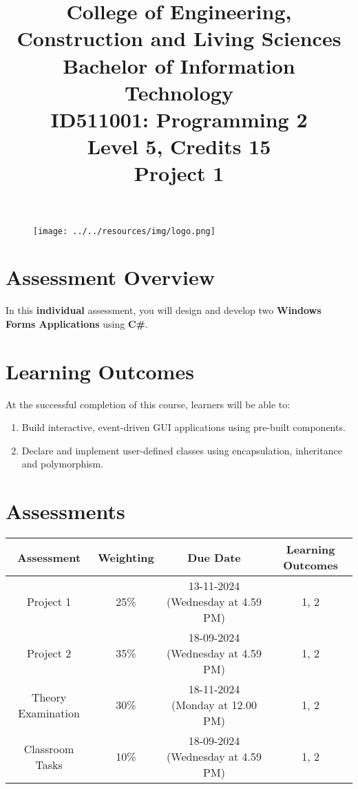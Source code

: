 \documentclass{article}
\author{}
\begin{document}
\begin{figure}
    \centering
    \texttt{[image: ../../resources/img/logo.png]}
\end{figure}

\title{College of Engineering, Construction and Living Sciences\\Bachelor of Information Technology\\ID511001: Programming 2\\Level 5, Credits 15\\\textbf{Project 1}}
\date{}
\maketitle

\section*{Assessment Overview}
In this \textbf{individual} assessment, you will design and develop two \textbf{Windows Forms Applications} using \textbf{C\#}. 

\section*{Learning Outcomes}
At the successful completion of this course, learners will be able to:
\begin{enumerate}
    \item Build interactive, event-driven GUI applications using pre-built components.
    \item Declare and implement user-defined classes using encapsulation, inheritance and polymorphism.
\end{enumerate} 

\section*{Assessments}
\renewcommand{\arraystretch}{1.5}
\begin{tabular}{|c|c|c|c|}
	\hline
	\textbf{Assessment}                                 & \textbf{Weighting} & \textbf{Due Date}            & \textbf{Learning Outcomes} \\ \hline
	\small Project 1 & \small 25\%        & \small \small 13-11-2024 (Wednesday at 4.59 PM)  & \small 1, 2                   \\ \hline
	\small Project 2  & \small 35\%        & \small 18-09-2024 (Wednesday at 4.59 PM)   & \small 1, 2                   \\ \hline
	\small Theory Examination                        & \small 30\%        & \small 18-11-2024 (Monday at 12.00 PM)  & \small 1, 2                   \\ \hline
	\small Classroom Tasks                      & \small 10\%        & \small 18-09-2024 (Wednesday at 4.59 PM)  & \small 1, 2                   \\ \hline
\end{tabular} 
\end{document}
